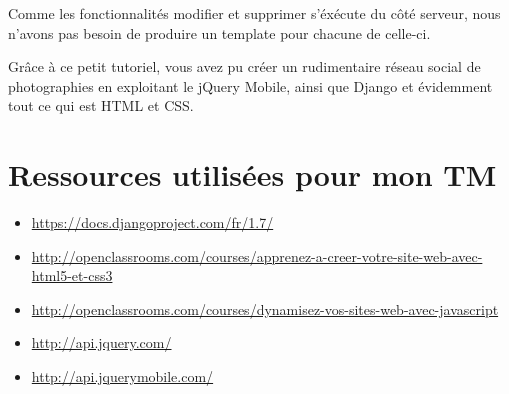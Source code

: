 \documentclass[letterpaper,10pt,french]{sphinxmanual}
\begin{document}
Comme les fonctionnalités modifier et supprimer s'éxécute du côté serveur, nous
n'avons pas besoin de produire un template pour chacune de celle-ci.

Grâce à ce petit tutoriel, vous avez pu créer un rudimentaire réseau social de
photographies en exploitant le jQuery Mobile, ainsi que Django et évidemment
tout ce qui est HTML et CSS.


\chapter{Ressources utilisées pour mon TM}
\label{ressources::doc}\label{ressources:ressources-utilisees-pour-mon-tm}\begin{itemize}
\item {} 
\href{https://docs.djangoproject.com/fr/1.7/}{https://docs.djangoproject.com/fr/1.7/}

\item {} 
\href{http://openclassrooms.com/courses/apprenez-a-creer-votre-site-web-avec-html5-et-css3}{http://openclassrooms.com/courses/apprenez-a-creer-votre-site-web-avec-html5-et-css3}

\item {} 
\href{http://openclassrooms.com/courses/dynamisez-vos-sites-web-avec-javascript}{http://openclassrooms.com/courses/dynamisez-vos-sites-web-avec-javascript}

\item {} 
\href{http://api.jquery.com/}{http://api.jquery.com/}

\item {} 
\href{http://api.jquerymobile.com/}{http://api.jquerymobile.com/}

\end{itemize}



\renewcommand{\indexname}{Index}
\printindex
\end{document}
